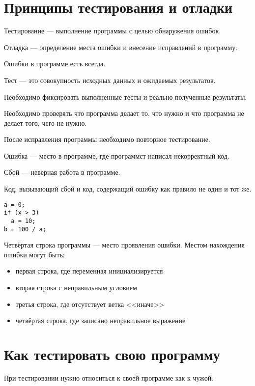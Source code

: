\documentclass[14pt,openany]{book}
\begin{document}
\begingroup
\hypersetup{linkcolor=black}
\tableofcontents
\endgroup

\clearpage

\chapter{Принципы тестирования и отладки}

Тестирование --- выполнение программы с целью обнаружения ошибок.

Отладка --- определение места ошибки и внесение исправлений в программу.

Ошибки в программе есть всегда.

Тест --- это совокупность исходных данных и ожидаемых результатов.

Необходимо фиксировать выполненные тесты и реально полученные результаты.

Необходимо проверять что программа делает то, что нужно и что программа
не делает того, чего не нужно.

После исправления программы необходимо повторное тестирование.

Ошибка --- место в программе, где программст написал некорректный код.

Сбой --- неверная работа в программе.

Код, вызывающий сбой и код, содержащий ошибку как правило не один и тот же.

\begin{lstlisting}
a = 0;
if (x > 3)
  a = 10;
b = 100 / a;
\end{lstlisting}

Четвёртая строка программы --- место проявления ошибки.
Местом нахождения ошибки могут быть:
\begin{itemize}
\item первая строка, где переменная инициализируется
\item вторая строка с неправильным условием
\item третья строка, где отсутствует ветка <<иначе>>
\item четвёртая строка, где записано неправильное выражение
\end{itemize}

\chapter{Как тестировать свою программу}

При тестировании нужно относиться к своей программе как к чужой.
\end{document}

